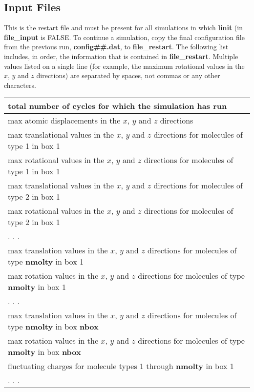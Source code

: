 \documentclass[12pt,letterpaper]{article}
\begin{document}
\subsection{Input Files}

 This is the restart file and
must be present for all simulations in which {\bf linit} (in
{\bf file\_input} is FALSE. To continue a simulation, copy
the final configuration file from the previous run, {\bf
  config\#\#.dat}, to {\bf file\_restart}. The following
list includes, in order, the information that is contained
in {\bf file\_restart}. Multiple values listed on a single
line (for example, the maximum rotational values in the $x$,
$y$ and $z$ directions) are separated by spaces, not commas
or any other characters.
\begin{center}
\begin{tabular}{| l |}
\hline
total number of cycles for which the simulation has run \\ \hline
max atomic displacements in the $x$, $y$ and $z$ directions  \\ \hline
max translational values in the $x$, $y$ and $z$ directions for molecules of type 1 in box 1 \\ \hline
max rotational values in the $x$, $y$ and $z$ directions for molecules of type 1 in box 1 \\ \hline
max translational values in the $x$, $y$ and $z$ directions for molecules of type 2 in box 1 \\ \hline
max rotational values in the $x$, $y$ and $z$ directions for molecules of type 2 in box 1 \\ \hline
  . . . \\ \hline
max translation values in the $x$, $y$ and $z$ directions for molecules of type {\bf nmolty} in box 1 \\ \hline
max rotation values in the $x$, $y$ and $z$ directions for molecules of type {\bf nmolty} in box 1 \\ \hline
  . . . \\ \hline
max translation values in the $x$, $y$ and $z$ directions for molecules of type {\bf nmolty} in box {\bf nbox} \\ \hline
max rotation values in the $x$, $y$ and $z$ directions for molecules of type {\bf nmolty} in box {\bf nbox} \\ \hline
fluctuating charges for molecule types 1 through {\bf nmolty} in box 1 \\ \hline
  . . . \\ \hline

\end{tabular}
\end{center}
\end{document}
